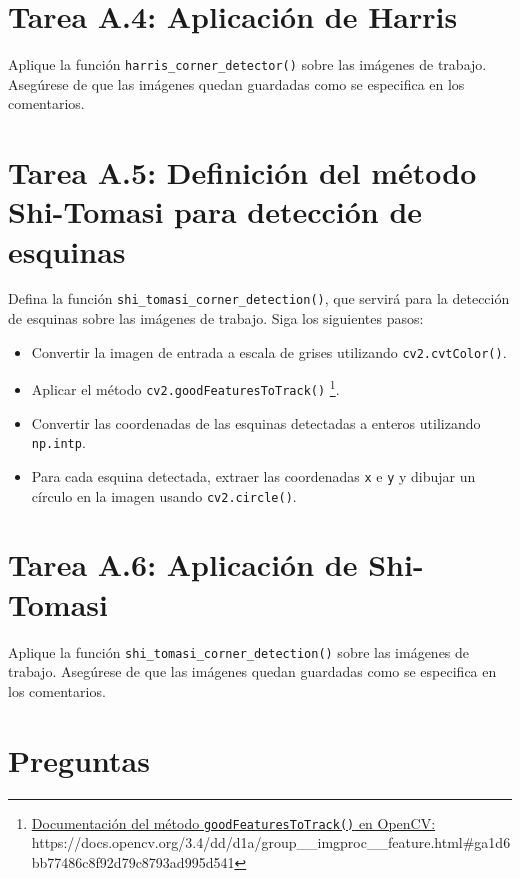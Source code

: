\section*{Tarea A.4: Aplicación de Harris}
Aplique la función \texttt{harris\_corner\_detector()} sobre las imágenes de trabajo. Asegúrese de que las imágenes quedan guardadas como se especifica en los comentarios.

\section*{Tarea A.5: Definición del método  Shi-Tomasi para detección de esquinas}
Defina la función \texttt{shi\_tomasi\_corner\_detection()}, que servirá para la detección de esquinas sobre las imágenes de trabajo. Siga los siguientes pasos:

\begin{itemize}
    \item Convertir la imagen de entrada a escala de grises utilizando \texttt{cv2.cvtColor()}.
    \item Aplicar el método \texttt{cv2.goodFeaturesToTrack()} \footnote{ \href{https://docs.opencv.org/3.4/dd/d1a/group\_\_imgproc\_\_feature.html\#ga1d6bb77486c8f92d79c8793ad995d541}{Documentación del método \texttt{goodFeaturesToTrack()} en OpenCV:} \\{https://docs.opencv.org/3.4/dd/d1a/group\_\_imgproc\_\_feature.html\#ga1d6bb77486c8f92d79c8793ad995d541}}.
    \item Convertir las coordenadas de las esquinas detectadas a enteros utilizando \texttt{np.intp}.
    \item Para cada esquina detectada, extraer las coordenadas \texttt{x} e \texttt{y} y dibujar un círculo en la imagen usando \texttt{cv2.circle()}.
\end{itemize}


\section*{Tarea A.6: Aplicación de Shi-Tomasi}
Aplique la función \texttt{shi\_tomasi\_corner\_detection()} sobre las imágenes de trabajo. Asegúrese de que las imágenes quedan guardadas como se especifica en los comentarios.

\section*{Preguntas}

